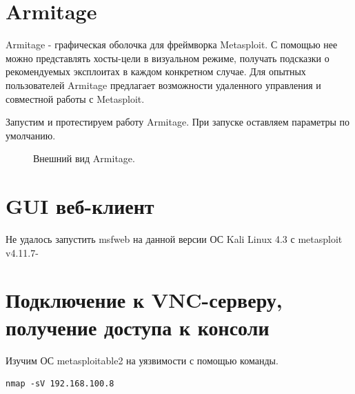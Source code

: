 \documentclass[10pt,a4paper]{report}
\begin{document}
\section{Armitage}

Armitage - графическая оболочка для фреймворка Metasploit. С помощью нее можно представлять хосты-цели в визуальном режиме, получать подсказки о рекомендуемых эксплоитах в каждом конкретном случае. Для опытных пользователей Armitage предлагает возможности удаленного управления и совместной работы с Metasploit.

Запустим и протестируем работу Armitage. При запуске оставляем параметры по умолчанию.

\begin{figure}[h!]	
	\caption{Внешний вид Armitage.}
	\label{Img:3}
\end{figure}
	
\section{GUI веб-клиент}
Не удалось запустить msfweb на данной версии ОС Kali Linux 4.3 с metasploit v4.11.7-

\section{Подключение к VNC-серверу, получение доступа к консоли}
Изучим ОС metasploitable2 на уязвимости с помощью команды.\\
\begin{verbatim}
nmap -sV 192.168.100.8
\end{verbatim}
\end{document}
